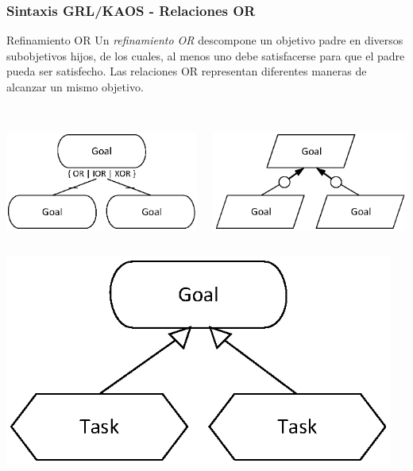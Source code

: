 \documentclass[slidestop,xcolor=pst,dvips,blue]{beamer}
\begin{document}
\begin{frame}[c]
    \frametitle{Sintaxis GRL/KAOS - Relaciones OR}
    \begin{block}{Refinamiento OR}
        Un \alert{\emph{refinamiento OR}} descompone un objetivo padre en diversos subobjetivos hijos, de los cuales, al menos uno debe satisfacerse para que el padre pueda ser satisfecho. Las relaciones OR representan diferentes maneras de alcanzar un mismo objetivo.
        \ \\
        \ \\
        \begin{columns}[c]
            \begin{column}{0.50\linewidth}
                \centering \includegraphics[width=0.65\columnwidth,keepaspectratio=true]{images/objetivos/orRef(GRL).eps}
            \end{column}
            \begin{column}{0.50\linewidth}
                \centering \includegraphics[width=0.65\columnwidth,keepaspectratio=true]{images/objetivos/orRef(KAOS).eps}
            \end{column}
        \end{columns}
        \begin{columns}[c]
            \begin{column}{0.50\linewidth}
                \centering \includegraphics[width=0.65\columnwidth,keepaspectratio=true]{images/objetivos/meansEnd(GRL).eps}
            \end{column}
            \begin{column}{0.50\linewidth}
            \end{column}
        \end{columns}
     \end{block}
\end{frame}
\end{document}
